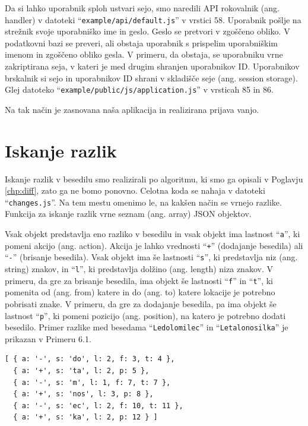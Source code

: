 \documentclass[a4paper, 12pt, twoside]{book}
\begin{document}
Da si lahko uporabnik sploh ustvari sejo, smo naredili API rokovalnik (ang. handler) v datoteki “{\tt example/api/default.js}” v vrstici 58. Uporabnik pošlje na strežnik svoje uporabniško ime in geslo. Geslo se pretvori v zgoščeno obliko. V podatkovni bazi se preveri, ali obstaja uporabnik s prispelim uporabniškim imenom in zgoščeno obliko gesla. V primeru, da obstaja, se uporabniku vrne zakriptirana seja, v kateri je med drugim shranjen uporabnikov ID. Uporabnikov brskalnik si sejo in uporabnikov ID shrani v skladišče seje (ang. session storage). Glej datoteko “{\tt example/public/js/application.js}” v vrsticah 85 in 86.

Na tak način je zasnovana naša aplikacija in realizirana prijava vanjo.

\section{Iskanje razlik}

Iskanje razlik v besedilu smo realizirali po algoritmu, ki smo ga opisali v Poglavju \ref{chp:diff}, zato ga ne bomo ponovno. Celotna koda se nahaja v datoteki “{\tt changes.js}”. Na tem mestu omenimo le, na kakšen način se vrnejo razlike. Funkcija za iskanje razlik vrne seznam (ang. array) JSON objektov.

Vsak objekt predstavlja eno razliko v besedilu in vsak objekt ima lastnost “{\tt a}”, ki pomeni akcijo (ang. action). Akcija je lahko vrednosti “{\tt +}” (dodajanje besedila) ali “{\tt -}” (brisanje besedila). Vsak objekt ima še lastnosti “{\tt s}”, ki predstavlja niz (ang. string) znakov, in “{\tt l}”, ki predstavlja dolžino (ang. length) niza znakov. V primeru, da gre za brisanje besedila, ima objekt še lastnosti “{\tt f}” in “{\tt t}”, ki pomenita od (ang. from) katere in do (ang. to) katere lokacije je potrebno pobrisati znake. V primeru, da gre za dodajanje besedila, pa ima objekt še lastnost “{\tt p}”, ki pomeni pozicijo (ang. position), na katero je potrebno dodati besedilo. Primer razlike med besedama “{\tt Ledolomilec}” in “{\tt Letalonosilka}” je prikazan v Primeru 6.1.\newline

\begin{lstlisting}[title={Primer 6.1: Razlike med besedama “{\tt Ledolomilec}” in “{\tt Letalonosilka}”.}]
[ { a: '-', s: 'do', l: 2, f: 3, t: 4 },
  { a: '+', s: 'ta', l: 2, p: 5 },
  { a: '-', s: 'm', l: 1, f: 7, t: 7 },
  { a: '+', s: 'nos', l: 3, p: 8 },
  { a: '-', s: 'ec', l: 2, f: 10, t: 11 },
  { a: '+', s: 'ka', l: 2, p: 12 } ]
\end{lstlisting}
\end{document}
